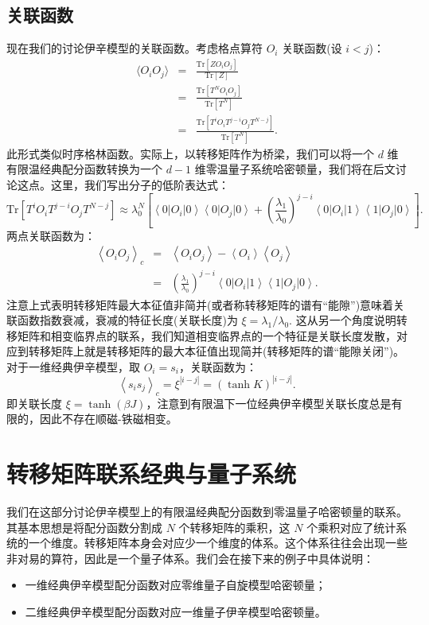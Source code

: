 \documentclass[UTF8]{ctexart}
\begin{document}
\subsection*{关联函数}
\noindent
现在我们的讨论伊辛模型的关联函数。考虑格点算符 $O_{i}$ 关联函数(设 $i<j$)：
\begin{eqnarray}
	\langle O_i O_j \rangle  
	& = & \frac{\mathrm{Tr} [Z O_i O_j]}{\mathrm{Tr}[Z]} \nonumber \\
 	& = & \frac{\mathrm{Tr} [T^{N}O_i O_j ]}{\mathrm{Tr}[T^{N}]}\nonumber \\
 	& = & \frac{\mathrm{Tr}[T^{i}O_i T^{j-i}O_j T^{N-j}]}{\mathrm{Tr}[T^{N}]}.
\end{eqnarray}
此形式类似时序格林函数。实际上，以转移矩阵作为桥梁，我们可以将一个 $d$ 维有限温经典配分函数转换为一个 $d - 1$ 维零温量子系统哈密顿量，我们将在后文讨论这点。这里，我们写出分子的低阶表达式：
\begin{equation}
	\mathrm{Tr} [T^{i}O_{i}T^{j-i}O_{j}T^{N-j}]
	\approx \lambda_0^N \left[\left\langle 0\right|O_{i}\left|0\right\rangle \left\langle 0\right|O_{j}\left|0\right\rangle +\left(\frac{\lambda_{1}}{\lambda_{0}}\right)^{j-i}\left\langle 0\right|O_{i}\left|1\right\rangle \left\langle 1\right|O_{j}\left|0\right\rangle \right].
\end{equation}
两点关联函数为：
\begin{eqnarray}
\left\langle O_{i}O_{j}\right\rangle _{c} & = & \left\langle O_{i}O_{j}\right\rangle -\left\langle O_{i}\right\rangle \left\langle O_{j}\right\rangle \nonumber \\
 & = & \left(\frac{\lambda_{1}}{\lambda_{0}}\right)^{j-i}\left\langle 0\right|O_{i}\left|1\right\rangle \left\langle 1\right|O_{j}\left|0\right\rangle .
\end{eqnarray}
注意上式表明转移矩阵最大本征值非简并(或者称转移矩阵的谱有“能隙”)意味着关联函数指数衰减，衰减的特征长度(关联长度)为 $\xi = \lambda_{1}/\lambda_{0}$. 这从另一个角度说明转移矩阵和相变临界点的联系，我们知道相变临界点的一个特征是关联长度发散，对应到转移矩阵上就是转移矩阵的最大本征值出现简并(转移矩阵的谱“能隙关闭”)。对于一维经典伊辛模型，取 $O_{i}=s_{i}$，关联函数为：
\begin{equation}
	\left\langle s_{i}s_{j}\right\rangle_c
	= \xi^{|i-j|}
	= \left(\tanh K\right)^{\left|i-j\right|}.
\end{equation}
即关联长度 $\xi = \tanh (\beta J)$，注意到有限温下一位经典伊辛模型关联长度总是有限的，因此不存在顺磁-铁磁相变。



\section*{转移矩阵联系经典与量子系统}
\noindent
我们在这部分讨论伊辛模型上的有限温经典配分函数到零温量子哈密顿量的联系。其基本思想是将配分函数分割成 $N$ 个转移矩阵的乘积，这 $N$ 个乘积对应了统计系统的一个维度。转移矩阵本身会对应少一个维度的体系。这个体系往往会出现一些非对易的算符，因此是一个量子体系。我们会在接下来的例子中具体说明：
\begin{itemize}
	\item 一维经典伊辛模型配分函数对应零维量子自旋模型哈密顿量；
	\item 二维经典伊辛模型配分函数对应一维量子伊辛模型哈密顿量。
\end{itemize}
\end{document}
